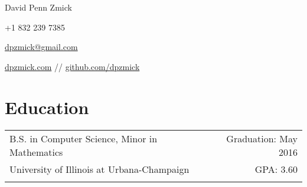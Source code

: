 \documentclass[letterpaper,10pt]{article}
\newcommand{\tbl}{3cm}
\newcommand{\tbr}{12.5cm}
\begin{document}
\begin{center}
    {\Large David Penn Zmick}

    +1 832 239 7385

    \href{mailto:dpzmick@gmail.com}{dpzmick@gmail.com}

    \href{http://dpzmick.com}{dpzmick.com} // \href{http://github.com/dpzmick}{github.com/dpzmick}

\end{center}


\section{Education}
\begin{tabular}{p{12.3cm}r}
    B.S. in Computer Science, Minor in Mathematics & Graduation: May 2016\\
    University of Illinois at Urbana-Champaign     & GPA: 3.60\\
    \\
\end{tabular}




\end{document}
